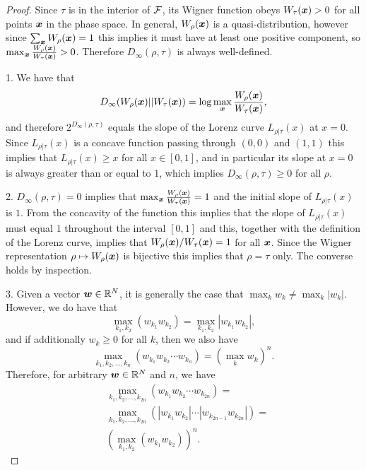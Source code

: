 \documentclass[pra,
aps,
twocolumn,
superscriptaddress,
groupedaddress,
nofootinbib,
reprint
]{revtex4-1}
\begin{document}
\begin{proof}
	Since $\tau$ is in the interior of ${\mathcal F}$, its Wigner function obeys $W_\tau(\boldsymbol{x}) >0$ for all points $\boldsymbol{x}$ in the phase space. In general, $W_\rho(\boldsymbol{x})$ is a quasi-distribution, however since $\sum_{\boldsymbol{x}} W_\rho (\boldsymbol{x}) = 1$ this implies it must have at least one positive component, so $\max_{\boldsymbol{x}} \frac{W_\rho(\boldsymbol{x})}{W_\tau(\boldsymbol{x})}>0$. Therefore $D_\infty (\rho,\tau)$ is always well-defined. 

1. We have that 
\begin{equation}
D_\infty(W_\rho(\boldsymbol{x}) || W_\tau (\boldsymbol{x})) =\log  \max_{\boldsymbol{x}} \frac{W_\rho(\boldsymbol{x})}{W_\tau(\boldsymbol{x})},
\end{equation}
and therefore $2^{D_\infty(\rho,\tau)}$ equals the slope of the Lorenz curve $L_{\rho|\tau}(x)$ at $x=0$. Since $L_{\rho|\tau}(x)$ is a concave function passing through $(0,0)$ and $(1,1)$ this implies that $L_{\rho |\tau}(x) \ge x$ for all $x \in [0,1]$, and in particular its slope at $x=0$ is always greater than or equal to $1$, which implies $D_\infty (\rho,\tau) \ge 0$ for all $\rho$.

2. $D_\infty (\rho,\tau) = 0$ implies that $\max_{\boldsymbol{x}} \frac{W_\rho(\boldsymbol{x})}{W_\tau(\boldsymbol{x})}=1$ and the initial slope of $L_{\rho|\tau}(x)$ is $1$. From the concavity of the function this implies that the slope of $L_{\rho|\tau}(x)$ must equal $1$ throughout the interval $[0,1]$ and this, together with the definition of the Lorenz curve, implies that $W_\rho(\boldsymbol{x})/W_\tau(\boldsymbol{x}) = 1$ for all $\boldsymbol{x}$. Since the Wigner representation $\rho \mapsto W_\rho(\boldsymbol{x})$ is bijective this implies that $\rho = \tau$ only. The converse holds by inspection.

3. Given a vector $\boldsymbol{w} \in \mathbb{R}^N$, it is generally the case that $\max_k w_k \ne \max_k |w_k|$. 
However, we do have that
\begin{equation}
	\max_{k_1,k_2} (w_{k_1} w_{k_2}) = \max_{k_1,k_2} |w_{k_1} w_{k_2}|,
\end{equation}
and if additionally $w_k \geq 0$ for all $k$, then we also have
\begin{equation}
	\max_{k_1, k_2, \dots, k_n} \left( w_{k_1}w_{k_2}\cdots w_{k_n} \right) = (\max_k w_k)^n.
\end{equation}
Therefore, for arbitrary $\boldsymbol{w} \in \mathbb{R}^N$ and $n$, we have
\begin{align}
	&\max_{k_1, k_2, \dots, k_{2n}}\left( w_{k_1}w_{k_2}\cdots w_{k_{2n}} \right) = \nonumber\\
	&\max_{k_1, k_2, \dots, k_{2n}}\left( |w_{k_1}w_{k_2}|\cdots |w_{k_{2n-1}}w_{k_{2n}}| \right) = \nonumber \\
	&\left( \max_{k_1 ,k_2}\left( w_{k_1} w_{k_2} \right) \right)^n.
\end{align}


\end{proof}
\end{document}
